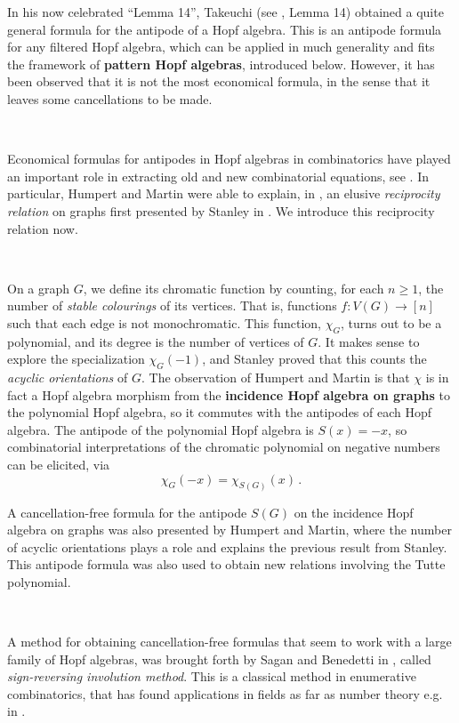 \documentclass[12pt, reqno]{amsart}
\theoremstyle{definition}
\begin{document}
In his now celebrated  ``Lemma 14'', Takeuchi (see \cite{Takeuchi1971}, Lemma 14) obtained a quite general formula for the antipode of a Hopf algebra. 
This is an antipode formula for any filtered Hopf algebra, which can be applied in much generality and fits the framework of \textbf{pattern Hopf algebras}, introduced below.
However, it has been observed that it is not the most economical formula, in the sense that it leaves some cancellations to be made.

\

Economical formulas for antipodes in Hopf algebras in combinatorics have played an important role in extracting old and new combinatorial equations, see \cite{Schmitt1993, humpert2012incidence, BS2017, aguiar2017hopf, xu2022cancellation}.
In particular, Humpert and Martin were able to explain, in \cite{humpert2012incidence}, an elusive \textit{reciprocity relation} on graphs first presented by Stanley in \cite{stanley1975combinatorial}.
We introduce this reciprocity relation now.

\

On a graph $G$, we define its chromatic function by counting, for each $n\geq 1$, the number of \textit{stable colourings} of its vertices.
That is, functions $f:V(G) \to [n]$ such that each edge is not monochromatic.
This function, $\chi_G$, turns out to be a polynomial, and its degree is the number of vertices of $G$.
It makes sense to explore the specialization $\chi_G(-1)$, and Stanley proved that this counts the \textit{acyclic orientations} of $G$.
The observation of Humpert and Martin is that $\chi$ is in fact a Hopf algebra morphism from the \textbf{incidence Hopf algebra on graphs} to the polynomial Hopf algebra, so it commutes with the antipodes of each Hopf algebra.
The antipode of the polynomial Hopf algebra is $S(x) = -x$, so combinatorial interpretations of the chromatic polynomial on negative numbers can be elicited, via
$$\chi_G(-x) = \chi_{S(G)}(x)\, .$$

A cancellation-free formula for the antipode $S(G)$ on the incidence Hopf algebra on graphs was also presented by Humpert and Martin, where the number of acyclic orientations plays a role and explains the previous result from Stanley.
This antipode formula was also used to obtain new relations involving the Tutte polynomial.


\

A method for obtaining cancellation-free formulas that seem to work with a large family of Hopf algebras, was brought forth by Sagan and Benedetti in \cite{BS2017}, called \textit{sign-reversing involution method}.
This is a classical method in enumerative combinatorics, that has found applications in fields as far as number theory e.g. in \cite{zagier2009one}.
\end{document}
